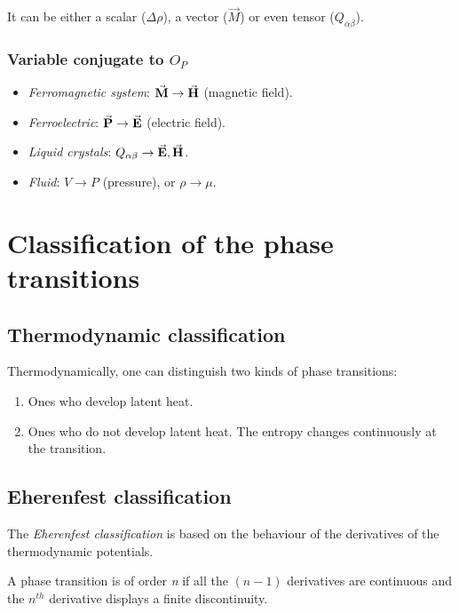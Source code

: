 \documentclass[../main/main.tex]{subfiles}
\begin{document}
It can be either a scalar ($\Delta \rho$), a vector ($\Vec{M}$) or even tensor ($Q_{\alpha \beta}$).
\subsubsection{Variable conjugate to \( O_P \)}
\begin{itemize}
\item \emph{Ferromagnetic system}: \( \va{M} \rightarrow \va{H}   \) (magnetic field).
\item \emph{Ferroelectric}: \( \va{P} \rightarrow \va{E}   \)  (electric field).
\item \emph{Liquid crystals}: \( Q_{\alpha \beta } \rightarrow \va{E},\va{H}   \).
\item \emph{Fluid}: \( V \rightarrow P \) (pressure), or \( \rho \rightarrow \mu  \).
\end{itemize}









\section{Classification of the phase transitions}

\subsection{Thermodynamic classification}
Thermodynamically, one can distinguish two kinds of phase transitions:
\begin{enumerate}
\item Ones who develop latent heat.
\item Ones who do not develop latent heat. The entropy changes continuously at the transition.
\end{enumerate}
\subsection{Eherenfest classification}
The \emph{Eherenfest classification} is based on the behaviour of the derivatives of the thermodynamic potentials.

A phase transition is of order \emph{n} if all the \( (n-1) \)  derivatives are continuous and the \( n^{th} \) derivative displays a finite discontinuity.
\end{document}
